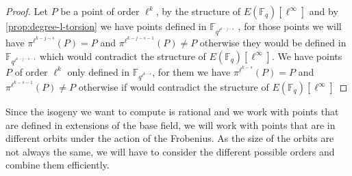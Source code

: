 \documentclass{lms}
\newcommand{\todo}[1]{{\color{red}TODO: #1}}
\begin{document}
\begin{proof}

 Let $P$ be a point of order $\ell^k$, by the structure of $E(\mathbb{F}_q)[\ell^{\infty}]$ and by \ref{prop:degree-l-torsion} we have points defined in $\mathbb{F}_{q^{\ell^{k-j-s}}}$ , for those points we will have $\pi^{\ell^{k-j-s}}(P)=P$ and $\pi^{\ell^{k-j-s-1}}(P) \neq P$ otherwise they would be defined in $\mathbb{F}_{q^{\ell^{k-j-s-1}}}$ which would contradict the structure of $E(\mathbb{F}_q)[\ell^{\infty}]$. We have points $P$ of order $\ell^k$ only defined in $\mathbb{F}_{q^{\ell^{k-s}}}$, for them we have $\pi^{\ell^{k-s}}(P)=P$ and $\pi^{\ell^{k-s-1}}(P) \neq P$ otherwise if would contradict the structure of $E(\mathbb{F}_q)[\ell^{\infty}]$
\end{proof}


Since the isogeny we want to compute is rational and we work with
points that are defined in extensions of the base field, we will work
with points that are in different orbits under the action of the
Frobenius. As the size of the orbits are not always the same, we will
have to consider the different possible orders and combine them
efficiently.
\end{document}
